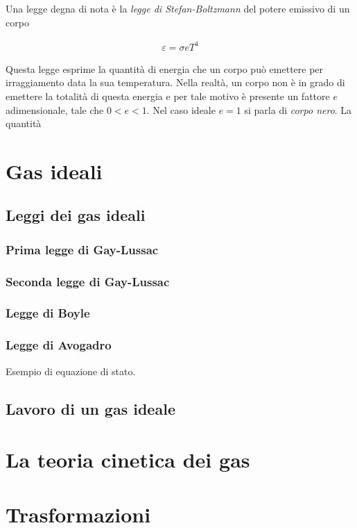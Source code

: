 Una legge degna di nota è la \textit{legge di Stefan-Boltzmann} del
potere emissivo di un corpo

\begin{align}
    \varepsilon = \sigma e T^4
\end{align}

\noindent Questa legge esprime la quantità di energia che un corpo
può emettere per irraggiamento data la sua temperatura. Nella realtà,
un corpo non è in grado di emettere la totalità di questa energia
e per tale motivo è presente un fattore $e$ adimensionale, tale che
$0 < e < 1$. Nel caso ideale $e = 1$ si parla di \textit{corpo nero}.
La quantità

\section{Gas ideali}

\subsection{Leggi dei gas ideali}

\subsubsection*{Prima legge di Gay-Lussac}
\subsubsection*{Seconda legge di Gay-Lussac}
\subsubsection*{Legge di Boyle}

\subsubsection*{Legge di Avogadro}
Esempio di equazione di stato.

\subsection{Lavoro di un gas ideale}

\section{La teoria cinetica dei gas}


\section{Trasformazioni}


